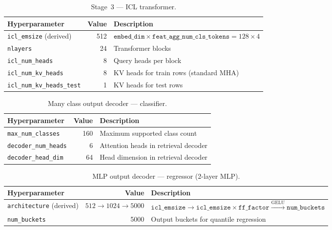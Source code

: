 \begin{table}[H]
\centering
\small
\caption{Stage~3 — ICL transformer.}
\begin{tabular}{lrl}
\toprule
\textbf{Hyperparameter} & \textbf{Value} & \textbf{Description} \\
\midrule
\texttt{icl\_emsize} (derived)     & 512 & $\texttt{embed\_dim} \times \texttt{feat\_agg\_num\_cls\_tokens} = 128 \times 4$ \\
\midrule
\texttt{nlayers}                   & 24  & Transformer blocks \\
\texttt{icl\_num\_heads}           & 8   & Query heads per block \\
\texttt{icl\_num\_kv\_heads}       & 8   & KV heads for train rows (standard MHA) \\
\texttt{icl\_num\_kv\_heads\_test} & 1   & KV heads for test rows \\
\bottomrule
\end{tabular}
\end{table}

\begin{table}[H]
\centering
\small
\caption{Many class output decoder — classifier.}
\begin{tabular}{lrl}
\toprule
\textbf{Hyperparameter} & \textbf{Value} & \textbf{Description} \\
\midrule
\texttt{max\_num\_classes}              & 160  & Maximum supported class count \\
\texttt{decoder\_num\_heads}            & 6    & Attention heads in retrieval decoder \\
\texttt{decoder\_head\_dim}             & 64   & Head dimension in retrieval decoder \\
\bottomrule
\end{tabular}
\end{table}

\begin{table}[h]
\centering
\small
\caption{MLP output decoder — regressor (2-layer MLP).}
\begin{tabular}{lrl}
\toprule
\textbf{Hyperparameter} & \textbf{Value} & \textbf{Description} \\
\midrule
\texttt{architecture} (derived) & $512 \to 1024 \to 5000$ & $\texttt{icl\_emsize} \to \texttt{icl\_emsize} \times \texttt{ff\_factor} \xrightarrow{\text{GELU}} \texttt{num\_buckets}$ \\
\midrule
\texttt{num\_buckets} & 5000 & Output buckets for quantile regression \\
\bottomrule
\end{tabular}
\end{table}

